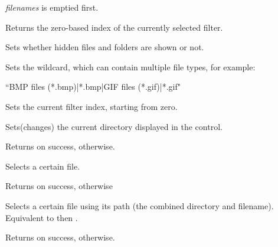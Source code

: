 
{\it filenames} is emptied first.

\label{wxfilectrlgetfilterindex}


Returns the zero-based index of the currently selected filter.

\label{wxfilectrlshowhidden}


Sets whether hidden files and folders are shown or not.

\label{wxfilectrlsetwildcard}


Sets the wildcard, which can contain multiple file types, for example:

``BMP files (*.bmp)|*.bmp|GIF files (*.gif)|*.gif"

\label{wxfilectrlsetfilterindex}


Sets the current filter index, starting from zero.

\label{wxfilectrlsetdirectory}


Sets(changes) the current directory displayed in the control.


Returns \true on success, \false otherwise.

\label{wxfilectrlsetfilename}


Selects a certain file.


Returns \true on success, \false otherwise

\label{wxfilectrlsetpath}


Selects a certain file using its path (the combined directory and filename).
Equivalent to  then .


Returns \true on success, \false otherwise.
